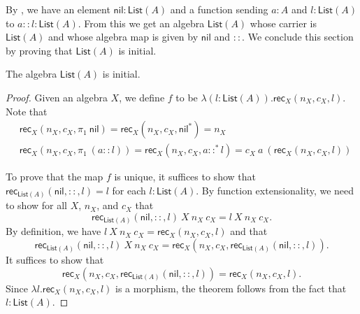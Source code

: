 \documentclass[a4paper,UKenglish,cleveref,numberwithinsect, autoref, thm-restate]{lipics-v2021}
\newcommand{\projl}[1]{\pi_1 \> #1}
\newcommand{\List}[1]{\mathsf{List}(#1)}
\newcommand{\NilI}{\mathsf{nil}^*}
\newcommand{\Nil}{\mathsf{nil}}
\newcommand{\ConsSym}{::}
\newcommand{\ConsI}[2]{#1 \ConsSym^* #2}
\newcommand{\Cons}[2]{#1 \ConsSym #2}
\newcommand{\Rec}[4]{\mathsf{rec}_{#1}(#2, #3, #4)}
\begin{document}
By ,
we have an element $\Nil : \List{A}$
and a function sending $a : A$ and $l : \List{A}$
to $\Cons{a}{l} : \List{A}$.
From this
we get an algebra $\List{A}$
whose carrier is $\List{A}$
and whose algebra map is given by $\Nil$ and $::$.
We conclude this section by proving that $\List{A}$ is initial.

\begin{theorem}
\label{thm:initial-impred}
The algebra $\List{A}$ is initial.
\end{theorem}

\begin{proof}
Given an algebra $X$,
we define $f$ to be $\lambda (l : \List{A}) . \Rec{X}{n_X}{c_X}{l}$.
Note that
\begin{align*}
&\Rec{X}{n_X}{c_X}{\projl{\Nil}} = \Rec{X}{n_X}{c_X}{\NilI} = n_X
\\
&\Rec{X}{n_X}{c_X}{\projl{(\Cons{a}{l})}} = \Rec{X}{n_X}{c_X}{\ConsI{a}{l}} = c_X \> a \> (\Rec{X}{n_X}{c_X}{l})
\end{align*}

To prove that the map $f$ is unique,
it suffices to show that $\Rec{\List{A}}{\Nil}{\ConsSym}{l} = l$
for each $l : \List{A}$.
By function extensionality,
we need to show for all $X$, $n_X$, and $c_X$ that
\[
\Rec{\List{A}}{\Nil}{\ConsSym}{l} \> X \> n_X \> c_X = l \> X \> n_X \> c_X.
\]
By definition,
we have $l \> X \> n_X \> c_X = \Rec{X}{n_X}{c_X}{l}$
and that
\[
\Rec{\List{A}}{\Nil}{\ConsSym}{l} \> X \> n_X \> c_X
=
\Rec{X}{n_X}{c_X}{\Rec{\List{A}}{\Nil}{\ConsSym}{l}}.
\]
It suffices to show that
\[
\Rec{X}{n_X}{c_X}{\Rec{\List{A}}{\Nil}{\ConsSym}{l}} 
=
\Rec{X}{n_X}{c_X}{l}.
\]
Since $\lambda l. \Rec{X}{n_X}{c_X}{l}$ is a morphism,
the theorem follows from the fact that $l : \List{A}$.
\end{proof}



\end{document}
